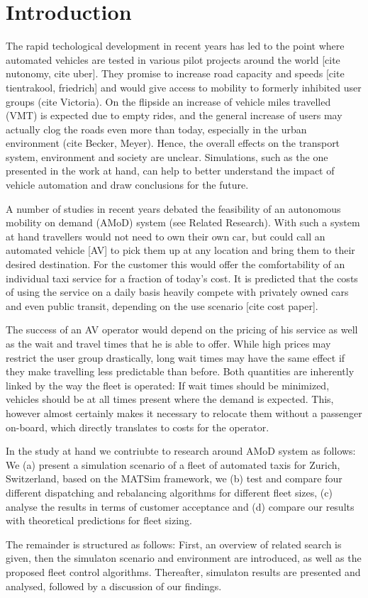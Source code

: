 \section{Introduction}

The rapid techological development in recent years has led to the point where
automated vehicles are tested in various pilot projects around the world [cite
nutonomy, cite uber]. They promise to increase road capacity and speeds
[cite tientrakool, friedrich] and would give access to mobility to formerly
inhibited user groups (cite Victoria). On the flipside an increase of vehicle
miles travelled (VMT) is expected due to empty rides, and the general increase
of users may actually clog the roads even more than today, especially
in the urban environment (cite Becker, Meyer). Hence, the overall effects on
the transport system, environment and society are unclear. Simulations, such as
the one presented in the work at hand, can help to better understand the impact
of vehicle automation and draw conclusions for the future.

A number of studies in recent years debated the feasibility of an autonomous
mobility on demand (AMoD) system (see Related Research). With such a system at hand
travellers would not need to own their own car, but could call an automated vehicle [AV]
to pick them up at any location and bring them to their desired destination. For
the customer this would offer the comfortability of an individual taxi service
for a fraction of today's cost. It is predicted that the costs of using the
service on a daily basis heavily compete with privately owned cars and even
public transit, depending on the use scenario [cite cost paper].

The success of an AV operator would depend on the pricing of his service
as well as the wait and travel times that he is able to offer. While high prices
may restrict the user group drastically, long wait times may have the same effect
if they make travelling less predictable than before. Both quantities are inherently
linked by the way the fleet is operated: If wait times should be minimized, vehicles
should be at all times present where the demand is expected. This, however almost
certainly makes it necessary to relocate them without a passenger on-board, which
directly translates to costs for the operator.

In the study at hand we contriubte to research around AMoD system as follows: We
(a) present a simulation scenario of a fleet of automated taxis for Zurich, Switzerland,
based on the MATSim framework, we (b) test and compare four different dispatching
and rebalancing algorithms for different fleet sizes, (c) analyse the results
in terms of customer acceptance and (d) compare our results with theoretical
predictions for fleet sizing.

The remainder is structured as follows: First, an overview of related search is
given, then the simulaton scenario and environment are introduced, as well as the
proposed fleet control algorithms. Thereafter, simulaton results are presented and
analysed, followed by a discussion of our findings.
